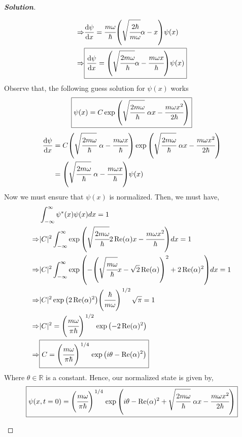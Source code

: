 \documentclass[10pt]{scrartcl}
\theoremstyle{definition}
\newenvironment{solution} {\begin{proof}[\normalfont \textbf{Solution}]} {\end{proof}}
\newcommand{\rn}{\mathbb{R}}
\begin{document}
\begin{solution}
\begin{enumerate}[label=(\alph*)]
\begin{align*}
                \Rightarrow &\dv{\psi}{x} = \cfrac{m\omega}{\hbar}\qty(\sqrt{\cfrac{2\hbar}{m\omega}}\alpha - x)\psi(x) \\
                \Rightarrow &\boxed{\dv{\psi}{x} = \qty(\sqrt{\cfrac{2m\omega}{\hbar}}\alpha - \cfrac{m\omega x}{\hbar})\psi(x)} \\
            \end{align*}
            Observe that, the following guess solution for $\psi(x)$ works
            $$\boxed{\psi(x) = C\exp\qty(\sqrt{\cfrac{2m\omega}{\hbar}}~\alpha x - \cfrac{m\omega x^2}{2\hbar})}$$
            \begin{align*}
                \dv{\psi}{x} &= C\qty(\sqrt{\cfrac{2m\omega}{\hbar}}~\alpha - \cfrac{m\omega x}{\hbar}) \exp\qty(\sqrt{\cfrac{2m\omega}{\hbar}}~\alpha x - \cfrac{m\omega x^2}{2\hbar}) \\ 
                             &= \qty(\sqrt{\cfrac{2m\omega}{\hbar}}~\alpha - \cfrac{m\omega x}{\hbar})\psi(x)
            \end{align*}
            Now we must ensure that $\psi(x)$ is normalized. Then, we must have, 
            \begin{align*}
                &\int_{-\infty}^\infty \psi^*(x)\psi(x)dx = 1 \\ 
                \Rightarrow &|C|^2 \int_{-\infty}^\infty \exp\qty(\sqrt{\cfrac{2m\omega}{\hbar}}2\Re(\alpha)x - \cfrac{m\omega x^2}{\hbar} )dx  = 1\\ 
                \Rightarrow &|C|^2 \int_{-\infty}^\infty \exp\qty(-\qty(\sqrt{\cfrac{m\omega}{\hbar}}x - \sqrt 2\Re(\alpha))^2 + 2\Re(\alpha)^2)dx  = 1\\ 
                \Rightarrow &|C|^2 \exp\qty(2\Re(\alpha)^2) \qty(\cfrac{\hbar}{m\omega})^{\flatfrac{1}{2}} \sqrt\pi = 1 \\
                \Rightarrow &|C|^2 = \qty(\cfrac{m\omega}{\pi\hbar})^{\flatfrac{1}{2}} \exp\qty(-2\Re(\alpha)^2) \\
                \Rightarrow &\boxed{C = \qty(\cfrac{m\omega}{\pi\hbar})^{\flatfrac{1}{4}} \exp\qty(i\theta -\Re(\alpha)^2)}
            \end{align*}
            Where $\theta \in \rn$ is a constant. Hence, our normalized state is given by, 
            $$\boxed{\psi(x, t=0) = \qty(\cfrac{m\omega}{\pi\hbar})^{\flatfrac{1}{4}}\exp\qty(i\theta -\Re(\alpha)^2 + \sqrt{\cfrac{2m\omega}{\hbar}}~\alpha x - \cfrac{m\omega x^2}{2\hbar})}$$
    \end{enumerate}
\end{solution}
\end{document}
